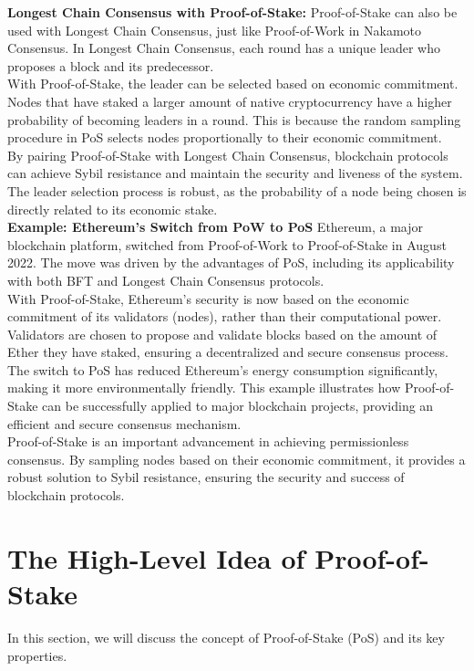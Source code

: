\noindent
\textbf{Longest Chain Consensus with Proof-of-Stake: }
Proof-of-Stake can also be used with Longest Chain Consensus, just like Proof-of-Work in Nakamoto Consensus. In Longest Chain Consensus, each round has a unique leader who proposes a block and its predecessor.\\
With Proof-of-Stake, the leader can be selected based on economic commitment. Nodes that have staked a larger amount of native cryptocurrency have a higher probability of becoming leaders in a round. This is because the random sampling procedure in PoS selects nodes proportionally to their economic commitment.\\
By pairing Proof-of-Stake with Longest Chain Consensus, blockchain protocols can achieve Sybil resistance and maintain the security and liveness of the system. The leader selection process is robust, as the probability of a node being chosen is directly related to its economic stake.\\

\noindent
\textbf{Example: Ethereum's Switch from PoW to PoS}
Ethereum, a major blockchain platform, switched from Proof-of-Work to Proof-of-Stake in August 2022. The move was driven by the advantages of PoS, including its applicability with both BFT and Longest Chain Consensus protocols.\\
With Proof-of-Stake, Ethereum's security is now based on the economic commitment of its validators (nodes), rather than their computational power. Validators are chosen to propose and validate blocks based on the amount of Ether they have staked, ensuring a decentralized and secure consensus process.\\
The switch to PoS has reduced Ethereum's energy consumption significantly, making it more environmentally friendly. This example illustrates how Proof-of-Stake can be successfully applied to major blockchain projects, providing an efficient and secure consensus mechanism.\\


Proof-of-Stake is an important advancement in achieving permissionless consensus. By sampling nodes based on their economic commitment, it provides a robust solution to Sybil resistance, ensuring the security and success of blockchain protocols.

\section{The High-Level Idea of Proof-of-Stake}
In this section, we will discuss the concept of Proof-of-Stake (PoS) and its key properties.
